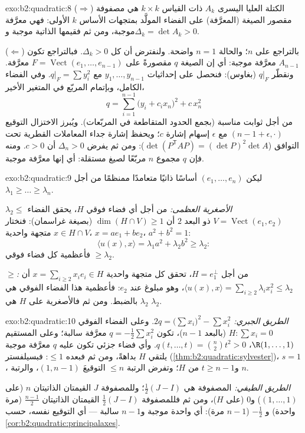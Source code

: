 \begin{solution}{exo:b2:quadratic:8}
($\Rightarrow$) الكتلة العليا اليسرى $A_k$ ذات القياس $k \times k$ هي مصفوفة
مقصور الصيغة (المعرَّفة) على الفضاء المولَّد بمتجهات الأساس
$k$ الأولى: فهي معرَّفة موجبة، ومن ثم فقيمها الذاتية
موجبة و$\Delta_k = \det A_k > 0$.

($\Leftarrow$) بالتراجع على $n$؛ والحالة $n = 1$ واضحة. ولنفترض أن كل
$\Delta_k > 0$. فبالتراجع تكون $A_{n-1}$ معرَّفة موجبة: أي إن
الصيغة $q$ مقصورةً على $F = \operatorname{Vect}(e_1, \dots,
e_{n-1})$ معرَّفة. ونقطّر $q|_F$ (بغاوس): فنحصل على إحداثيات
$y_1, \dots, y_{n-1}$ مع $q|_F = \sum y_i^2$. وفي الفضاء الكامل،
وبإتمام المربّع في المتغير الأخير،
\[
q = \sum_{i=1}^{n-1} \bigl(y_i + c_i x_n\bigr)^2 + c\,x_n^2
\]
من أجل ثوابت مناسبة (بجمع الحدود المتقاطعة في المربّعات).
ويُبرز الاختزال التوقيع $(n-1 + \epsilon, \cdot)$ مع
$\epsilon$ إسهام إشارة $c$؛ ويحفظ 
إشارة جداء المعاملات القطرية تحت
التوافق ($\det(P^{\mathsf T}AP) = (\det P)^2\det A$): ومن ثم يفرض $\Delta_n
> 0$ أن $c > 0$. ومنه فإن $q$ مجموع $n$ مربّعًا
لصيغ مستقلة: أي إنها معرَّفة موجبة.
\end{solution}

\begin{solution}{exo:b2:quadratic:9}
ليكن $(e_1, \dots, e_n)$ أساسًا ذاتيًا متعامدًا ممنظمًا من أجل $\lambda_1
\geq \dots \geq \lambda_n$.

\emph{$\lambda_2 \leq$ الأصغرية العظمى:} من أجل أي فضاء فوقي $H$، يحقق
الفضاء $V = \operatorname{Vect}(e_1, e_2)$ ذو البعد $2$
أن $\dim(H \cap V) \geq 1$ (بصيغة غراسمان): فنختار متجهة واحدية $x \in H \cap V$،
$x = ae_1 + be_2$، $a^2 + b^2 = 1$:
\[
\langle u(x), x\rangle = \lambda_1 a^2 + \lambda_2 b^2 \geq
\lambda_2 :
\]
فأعظمية كل فضاء فوقي $\geq \lambda_2$.

\emph{$\geq$:} من أجل $H = e_1^{\perp}$، تحقق كل متجهة واحدية $x = \sum_{i\geq2}
x_ie_i \in H$ أن $\langle u(x), x\rangle = \sum_{i \geq 2}
\lambda_i x_i^2 \leq \lambda_2$، وهو مبلوغ عند $e_2$: فأعظمية
هذا الفضاء الفوقي هي $\lambda_2$ بالضبط. ومن ثم فالأصغرية على $H$
هي $\lambda_2$.
\end{solution}

\begin{solution}{exo:b2:quadratic:10}
\emph{الطريق الجبري:} $2q = \bigl(\sum x_i\bigr)^2 - \sum
x_i^2$. وعلى الفضاء الفوقي $H : \sum x_i = 0$ (بالبعد $n -
1$)، تكون $q = -\frac12\sum x_i^2$ معرَّفة سالبة؛ وعلى المستقيم
$\R(1, \dots, 1)$، $q(t, \dots, t) = \binom n2 t^2 > 0$. وأي
فضاء جزئي تكون عليه $q$ معرَّفة موجبة يلتقي $H$ بداهةً، ومن ثم
فبعده $\leq 1$: فبسيلفستر
(\cref{thm:b2:quadratic:sylvester})، $s = 1$، و$t \geq n-1$
من $H$؛ وتفرض الرتبة $\leq n$ التوقيعَ $(1, n-1)$، والرتبة $n$.

\emph{الطريق الطيفي:} المصفوفة هي $\frac12(J - I)$؛ وللمصفوفة $J$
القيمتان الذاتيتان $n$ (على $(1,\dots,1)$) و$0$ (على $H$)، ومن ثم
فللمصفوفة $\frac12(J-I)$ القيمتان الذاتيتان $\frac{n-1}{2}$ (مرة واحدة) و
$-\frac12$ ($n-1$ مرة): أي واحدة موجبة و$n-1$ سالبة --- أي التوقيع
نفسه، حسب \cref{cor:b2:quadratic:principalaxes}.
\end{solution}

